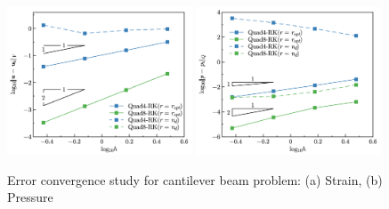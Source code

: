 \begin{figure}[H]
\centering
\includegraphics[width=0.49\textwidth]{png/cantilever_Hdev.png}
\includegraphics[width=0.49\textwidth]{png/cantilever_L2_p.png}
\caption{Error convergence study for cantilever beam problem: (a) Strain, (b) Pressure}\label{fg:cantilever_convergence}
\end{figure}

